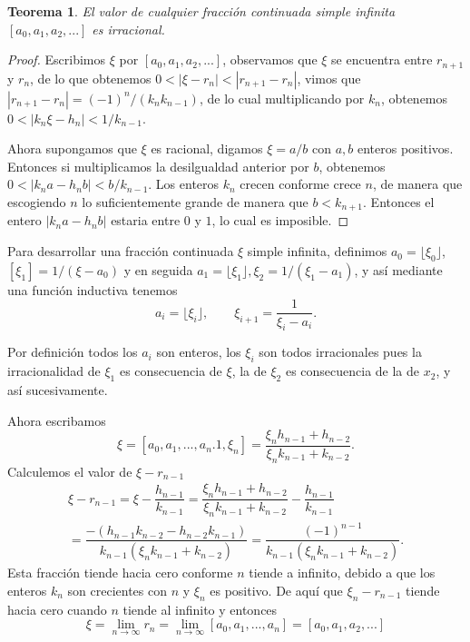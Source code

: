 \documentclass[11pt, article]{article}
\newtheorem{theorem}{Teorema} %
\begin{document}
    \begin{theorem}
        El valor de cualquier fracción continuada simple infinita $[a_0,a_1,a_2,...]$ es irracional.
    \end{theorem} 
    
    \begin{proof}
       Escribimos $\xi$ por $[a_0,a_1, a_2, ...]$, observamos que $\xi$ se encuentra entre $r_{n+1}$ y $r_n$, de lo que obtenemos $0<|\xi - r_n|<|r_{n+1}-r_n|$, vimos que $|r_{n+1}-r_n|=(-1)^n/(k_nk_{n-1})$, de lo cual multiplicando por $k_n$, obtenemos $0<|k_n\xi-h_n|<1/k_{n-1}$.
       
       Ahora supongamos que $\xi$ es racional, digamos $\xi=a/b$ con $a,b$ enteros positivos. Entonces si multiplicamos la desilgualdad anterior por $b$, obtenemos $0<|k_na-h_nb|<b/k_{n-1}$.
       Los enteros $k_n$ crecen conforme crece $n$, de manera que escogiendo $n$ lo suficientemente grande de manera que $b<k_{n+1}$. Entonces el entero $|k_na-h_nb|$ estaria entre $0$ y $1$, lo cual es imposible.
    \end{proof}
        
    Para desarrollar una fracción continuada $\xi$ simple infinita, definimos $a_0=\lfloor \xi_0 \rfloor$, $[\xi_1]=1/(\xi-a_0)$ y en seguida $a_1= \lfloor \xi_1 \rfloor, \xi_2=1/(\xi_1-a_1)$, y así mediante una función inductiva tenemos
        \begin{equation}
        a_i=\lfloor \xi_i \rfloor, \qquad \xi_{i+1}=\dfrac{1}{\xi_i-a_i}.
        \label{ecuacion_1}
        \end{equation}

    Por definición todos los $a_i$ son enteros, los $\xi_i$ son todos irracionales pues la irracionalidad de $\xi_1$ es consecuencia de $\xi$, la de $\xi_2$ es consecuencia de la de $x_2$, y así sucesivamente. 
    
    Ahora escribamos 
    \[ 
    \xi=[a_0,a_1,...,a_n.1,\xi_n]=\dfrac{\xi_nh_{n-1}+h_{n-2}}{\xi_nk_{n-1}+k_{n-2}}.
    \]
    Calculemos el valor de $\xi-r_{n-1}$
    \begin{align*}
        \xi-r_{n-1}=\xi-\dfrac{h_{n-1}}{k_{n-1}}=\dfrac{\xi_nh_{n-1}+h_{n-2}}{\xi_nk_{n-1}+k_{n-2}}-\dfrac{h_{n-1}}{k_{n-1}}\\
        =\dfrac{-(h_{n-1}k_{n-2}-h_{n-2}k_{n-1})}{k_{n-1}(\xi_nk_{n-1}+k_{n-2})}=\dfrac{(-1)^{n-1}}{k_{n-1}(\xi_nk_{n-1}+k_{n-2})}.
    \end{align*}
    Esta fracción tiende hacia cero conforme $n$ tiende a infinito, debido a que los enteros $k_n$ son crecientes con $n$ y $\xi_n$ es positivo. De aquí que $\xi_n-r_{n-1}$ tiende hacia cero cuando $n$ tiende al infinito y entonces
        \[
        \xi=\lim_{n\to\infty} r_n=\lim_{n\to\infty}[a_0,a_1,...,a_n]=[a_0,a_1,a_2,...]
        \]
        
\end{document}
